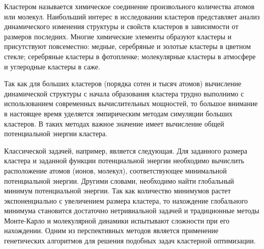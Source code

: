 Кластером называется химическое соединение произвольного количества атомов или молекул.
Наибольший интерес в исследовании кластеров представляет анализ динамического изменения
структуры и свойств кластеров в зависимости от размеров последних.
Многие химические элементы образуют кластеры и присутствуют повсеместно:
медные, серебряные и золотые кластеры в цветном стекле; серебряные кластеры
в фотопленке; молекулярные кластеры в атмосфере и углеродные кластеры в саже.

Так как для больших кластеров (порядка сотен и тысяч атомов) вычисление
динамической структуры с начала образования кластера трудно выполнимо с
использованием современных вычислительных мощностей, то большое внимание
в настоящее время уделяется эмпирическим методам симуляции больших кластеров.
В таких методах важное значение имеет вычисление общей потенциальной энергии
кластера.

Классической задачей, например, является следующая. Для заданного размера кластера
и заданной функции потенциальной энергии необходимо вычислить расположение атомов
(ионов, молекул), соответствующее минимальной потенциальной энергии. Другими словами,
необходимо найти глобальный минимум потенциальной энергии. Так как количество минимумов
растет экспоненциально с увеличением размера кластера, то нахождение глобального минимума
становится достаточно нетривиальной задачей и традиционные методы Монте-Карло и молекулярной
динамики испытывают сложности при его нахождении. Одним из перспективных методов является
применение генетических алгоритмов для решения подобных задач кластерной оптимизации.
